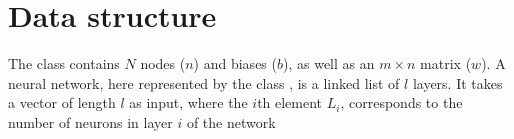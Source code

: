 \section*{Data structure}
The class  contains $N$ nodes ($n$) and biases ($b$), as well as an $m \times n$ matrix ($w$).
A neural network, here represented by the class , is a linked list of $l$ layers. It takes a vector  of length $l$ as input, where the $i$th element $L_i$, corresponds to the number of neurons in layer $i$ of the network